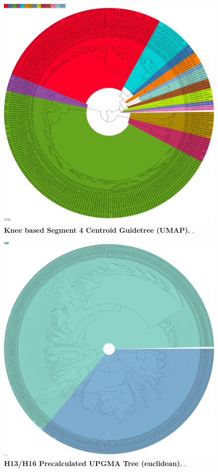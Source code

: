 \begin{figure}[!hbt]
    \centering
    \includegraphics[width=\textwidth]{UMAP/Guidetree_segment_4_H_Centroid.pdf}
    \caption[Knee based Segment 4 Centroid Guidetree (\Acrshort{UMAP})]{\textbf{Knee based Segment 4 Centroid Guidetree (\Acrshort{UMAP}).} .}
    \label{fig:UMAP_Guidetree_Centroid_4}
\end{figure}

\begin{figure}[!hbt]
    \centering
    \includegraphics[width=\textwidth]{UMAP/Precalculated_Segment_4_H_Euclidean.pdf}
    \caption[H13/H16 Precalculated \Acrshort{UPGMA} Tree (euclidean)]{\textbf{H13/H16 Precalculated \Acrshort{UPGMA} Tree (euclidean).} .}
    \label{fig:Precalculated_Euclid}
\end{figure}

